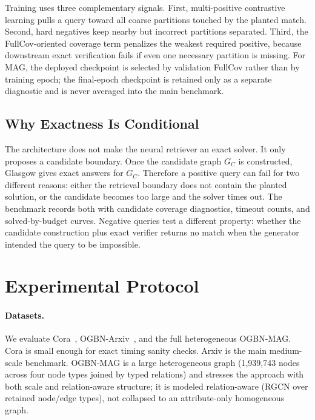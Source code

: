 \documentclass[runningheads]{llncs}
\begin{document}
Training uses three complementary signals. First, multi-positive contrastive learning pulls a query toward all coarse partitions touched by the planted match. Second, hard negatives keep nearby but incorrect partitions separated. Third, the FullCov-oriented coverage term penalizes the weakest required positive, because downstream exact verification fails if even one necessary partition is missing. For MAG, the deployed checkpoint is selected by validation FullCov rather than by training epoch; the final-epoch checkpoint is retained only as a separate diagnostic and is never averaged into the main benchmark.

\subsection{Why Exactness Is Conditional}

The architecture does not make the neural retriever an exact solver. It only proposes a candidate boundary. Once the candidate graph $G_C$ is constructed, Glasgow gives exact answers for $G_C$. Therefore a positive query can fail for two different reasons: either the retrieval boundary does not contain the planted solution, or the candidate becomes too large and the solver times out. The benchmark records both with candidate coverage diagnostics, timeout counts, and solved-by-budget curves. Negative queries test a different property: whether the candidate construction plus exact verifier returns no match when the generator intended the query to be impossible.

\section{Experimental Protocol}

\paragraph{Datasets.}
We evaluate Cora~\cite{ref_cora}, OGBN-Arxiv~\cite{ref_ogb}, and the full heterogeneous OGBN-MAG. Cora is small enough for exact timing sanity checks. Arxiv is the main medium-scale benchmark. OGBN-MAG is a large heterogeneous graph (1{,}939{,}743 nodes across four node types joined by typed relations) and stresses the approach with both scale and relation-aware structure; it is modeled relation-aware (RGCN over retained node/edge types), not collapsed to an attribute-only homogeneous graph.
\end{document}
